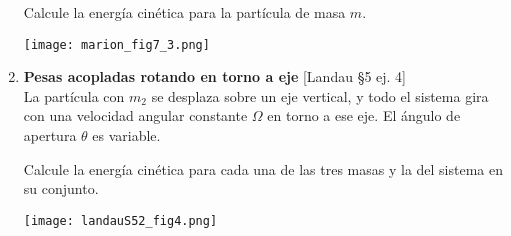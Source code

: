 \documentclass[11pt, spanish, a4paper, twoside]{article}
\begin{document}
\begin{enumerate}
\begin{minipage}[t][7cm]{0.55\textwidth}
				Calcule la energía cinética para la partícula de masa \(m\).
				\end{minipage}
			\begin{minipage}[c][3cm][t]{0.5\textwidth}
				\texttt{[image: marion\_fig7\_3.png]}
			\end{minipage}



		\item \begin{minipage}[t][4.5cm]{0.65\textwidth}
			\textbf{Pesas acopladas rotando en torno a eje} [Landau \S5 ej. 4]\\
			La partícula con \(m_2\) se desplaza sobre un eje vertical, y todo el sistema gira con una velocidad angular constante \(\Omega\) en torno a ese eje.
			El ángulo de apertura \(\theta\) es variable.

			Calcule la energía cinética para cada una de las tres masas y la del sistema en su conjunto.
		\end{minipage}
			\begin{minipage}[c][5cm][t]{0.35\textwidth}
			\texttt{[image: landauS52\_fig4.png]}
		\end{minipage}




\end{enumerate}
\end{document}
